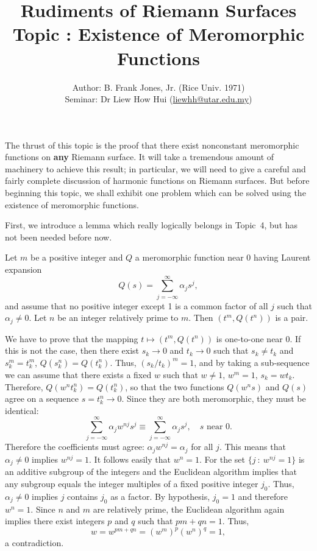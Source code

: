 \documentclass[a4paper,11pt]{article}
\newcounter{topic}
\begin{document}
\title{{\sc Rudiments of Riemann Surfaces\\
    Topic \thetopic{}: Existence of Meromorphic Functions}}
\author{Author: B. Frank Jones, Jr. (Rice Univ. 1971)\\
Seminar: Dr Liew How Hui (\url{liewhh@utar.edu.my})}
\date{}

\maketitle

The thrust of this topic is the proof that there exist nonconstant
meromorphic functions on \textbf{any} Riemann surface.  It will take a
tremendous amount of machinery to achieve this result; in particular,
we will need to give a careful and fairly complete discussion of
harmonic functions on Riemann surfaces.  But before beginning this
topic, we shall exhibit one problem which can be solved using the
existence of meromorphic functions.

First, we introduce a lemma which really logically belongs in Topic~4,
but has not been needed before now.

\begin{lem}
  \label{lem:1}
  Let $m$ be a positive integer and $Q$ a meromorphic function near 0
  having Laurent expansion
  $$
  Q(s) = \sum_{j=-\infty}^{\infty} \alpha_j s^j,
  $$
  and assume that no positive integer except 1 is a common factor of
  all $j$ such that $\alpha_j \ne 0$.  Let $n$ be an integer
  relatively prime to $m$.  Then $(t^m, Q(t^n))$ is a pair.
\end{lem}

\begin{myproof}
  We have to prove that the mapping $t \mapsto (t^m, Q(t^n))$ is
  one-to-one near 0.  If this is not the case, then there exist $s_k
  \to 0$ and $t_k \to 0$ such that $s_k \ne t_k$ and $s_k^m = t_k^m$, 
  $Q(s_k^n) = Q(t_k^n)$.  Thus, $(s_k/t_k)^m = 1$, and by taking a
  sub-sequence we can assume that there exists a fixed $w$ such that
  $w \ne 1$, $w^m = 1$, $s_k = wt_k$.  Therefore, $Q(w^n t_k^n) =
  Q(t_k^n)$, so that the two functions $Q(w^n s)$ and $Q(s)$ agree on
  a sequence $s = t_k^n \to 0$.  Since they are both meromorphic, they
  must be identical:
  $$
  \sum_{j=-\infty}^{\infty} \alpha_j w^{nj} s^j 
  \equiv \sum_{j=-\infty}^{\infty} \alpha_j s^j,\quad s \text{ near } 0.
  $$
  Therefore the coefficients must agree: $\alpha_j w^{nj} = \alpha_j$
  for all $j$.  This means that $\alpha_j \ne 0$ implies $w^{nj} =
  1$.  It follows easily that $w^n = 1$.  For the set $\{ j ~:~ w^{nj}
  = 1\}$ is an additive subgroup of the integers and the Euclidean
  algorithm implies that any subgroup equals the integer  multiples of
  a fixed positive integer $j_0$.  Thus, $\alpha_j \ne 0$ implies $j$
  contains $j_0$ as a factor.  By hypothesis, $j_0 = 1$ and therefore
  $w^n = 1$.  Since $n$ and $m$ are relatively prime, the Euclidean
  algorithm again implies there exist integers $p$ and $q$ such that
  $pm + qn = 1$.  Thus,
  $$
  w = w^{pm + qn} = (w^m)^p(w^n)^q = 1,
  $$
  a contradiction.
\end{myproof}
\end{document}
